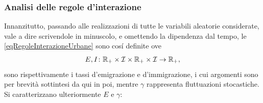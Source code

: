       
      \subsubsection{Analisi delle regole d'interazione}

        Innanzitutto, passando alle realizzazioni di tutte le variabili aleatorie considerate, vale a dire scrivendole in minuscolo, e omettendo la dipendenza dal tempo, le \ref{eqRegoleInterazioneUrbane} sono cosí definite\footnotemark{}%
        ove
        \begin{equation*}
            E,I\colon\RPlus\times\mathcal I\times\RPlus\times\mathcal I\to\RPlus,%
        \end{equation*}
        sono rispettivamente i tassi d'emigrazione e d'immigrazione, i cui argomenti sono per brevità sottintesi da qui in poi, mentre \(\gamma\) rappresenta fluttuazioni stocastiche. Si caratterizzano ulteriormente \(E\) e \(\gamma\):

